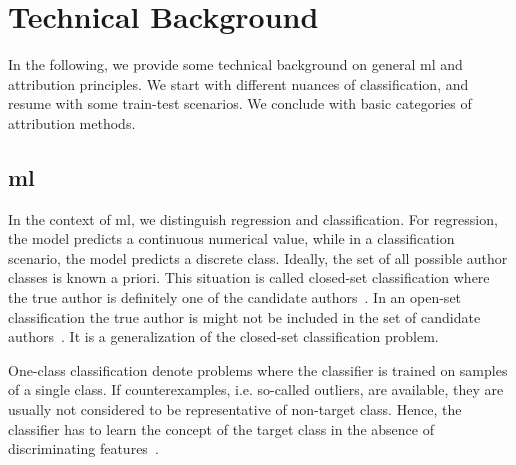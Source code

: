 \section{Technical Background}

In the following, we provide some technical background on general \ac{ml} and attribution principles.
We start with different nuances of classification, and resume with some train-test scenarios.
We conclude with basic categories of attribution methods.

\subsection{\acl{ml}}
In the context of \ac{ml}, we distinguish regression and classification.
For regression, the model predicts a continuous numerical value, while in a classification scenario, the model predicts a discrete class.
Ideally, the set of all possible author classes is known a priori.
This situation is called closed-set classification where the true author is definitely one of the candidate authors~\citep{stamatatos_survey_2009,koppel_authorship_2011,barlas_cross_domain_2020,boenninghoff_o2d2_2021,neal_surveying_2018}.
In an open-set classification the true author is might not be included in the set of candidate authors~\citep{stamatatos_survey_2009,barlas_cross_domain_2020,neal_surveying_2018}.
It is a generalization of the closed-set classification problem.

One-class classification denote problems where the classifier is trained on samples of a single class.
If counterexamples, i.e. so-called outliers, are available, they are usually not considered to be representative of non-target class.
Hence, the classifier has to learn the concept of the target class in the absence of discriminating features~\citep{stein_intrinsic_2011,koppel_authorship_2004}.

